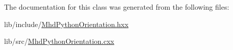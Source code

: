 \-The documentation for this class was generated from the following files\-:\begin{DoxyCompactItemize}
\item 
lib/include/\hyperlink{MhdPythonOrientation_8hxx}{\-Mhd\-Python\-Orientation.\-hxx}\item 
lib/src/\hyperlink{MhdPythonOrientation_8cxx}{\-Mhd\-Python\-Orientation.\-cxx}\end{DoxyCompactItemize}
